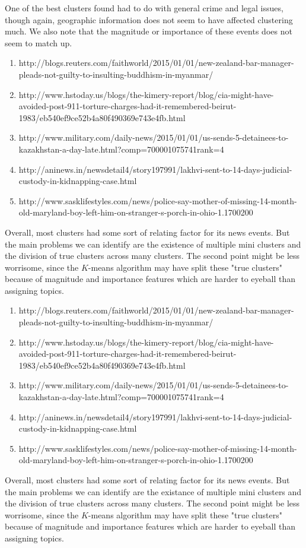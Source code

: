 \documentclass{article}
\begin{document}
	One of the best clusters found had to do with general crime and legal issues, though again, geographic information does not seem to have affected clustering much. We also note that the magnitude or importance of these events does not seem to match up.
	\begin{enumerate}
	\item http://blogs.reuters.com/faithworld/2015/01/01/new-zealand-bar-manager-pleads-not-guilty-to-insulting-buddhism-in-myanmar/
	\item http://www.hstoday.us/blogs/the-kimery-report/blog/cia-might-have-avoided-post-911-torture-charges-had-it-remembered-beirut-1983/eb540ef9ce52b4a80f490369e743e4fb.html
	\item http://www.military.com/daily-news/2015/01/01/us-sends-5-detainees-to-kazakhstan-a-day-late.html?comp=700001075741rank=4
	\item http://aninews.in/newsdetail4/story197991/lakhvi-sent-to-14-days-judicial-custody-in-kidnapping-case.html
	\item http://www.sasklifestyles.com/news/police-say-mother-of-missing-14-month-old-maryland-boy-left-him-on-stranger-s-porch-in-ohio-1.1700200
	\end{enumerate}

	Overall, most clusters had some sort of relating factor for its news events. But the main problems we can identify are the existence of multiple mini clusters and the division of true clusters across many clusters. The second point might be less worrisome, since the $K$-means algorithm may have split these "true clusters" because of magnitude and importance features which are harder to eyeball than assigning topics.
\begin{enumerate}
\item http://blogs.reuters.com/faithworld/2015/01/01/new-zealand-bar-manager-pleads-not-guilty-to-insulting-buddhism-in-myanmar/
\item http://www.hstoday.us/blogs/the-kimery-report/blog/cia-might-have-avoided-post-911-torture-charges-had-it-remembered-beirut-1983/eb540ef9ce52b4a80f490369e743e4fb.html
\item http://www.military.com/daily-news/2015/01/01/us-sends-5-detainees-to-kazakhstan-a-day-late.html?comp=700001075741rank=4
\item http://aninews.in/newsdetail4/story197991/lakhvi-sent-to-14-days-judicial-custody-in-kidnapping-case.html
\item http://www.sasklifestyles.com/news/police-say-mother-of-missing-14-month-old-maryland-boy-left-him-on-stranger-s-porch-in-ohio-1.1700200
\end{enumerate}

Overall, most clusters had some sort of relating factor for its news events. But the main problems we can identify are the existance of multiple mini clusters and the division of true clusters across many clusters. The second point might be less worrisome, since the $K$-means algorithm may have split these "true clusters" because of magnitude and importance features which are harder to eyeball than assigning topics. 
\end{document}
